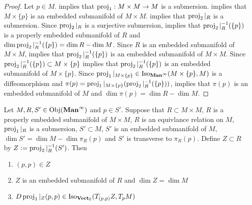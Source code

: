 \documentclass{book}
\begin{document}
	\begin{proof}
		Let $p \in M$.  implies that $\operatorname{\text{proj}}_1: M \times M \rightarrow M$ is a submersion. \rex{} implies that $M \times \{p\}$ is an embedded submanifold of $M \times M$.  implies that $\operatorname{\text{proj}}_2|_R$ is a submersion. Since $\operatorname{\text{proj}}_2|_R$ is a surjective submersion,  implies that $\operatorname{\text{proj}}_2|_R^{-1}(\{p\})$ is a properly embedded submanifold of $R$ and $\dim \operatorname{\text{proj}}_2|_R^{-1}(\{p\}) = \dim R - \dim M$. Since $R$ is an embedded submanifold of $M \times M$,   implies that $\operatorname{\text{proj}}_2|_R^{-1}(\{p\})$ is an embedded submanifold of $M \times M$. Since $\operatorname{\text{proj}}_2|_R^{-1}(\{p\}) \subset M \times \{p\}$  implies that $\operatorname{\text{proj}}_2|_R^{-1}(\{p\})$ is an embedded submanifold of $M \times \{p\}$. Since $\operatorname{\text{proj}}_1|_{M \times \{p\}} \in \operatorname{Iso}_{\operatorname*{\text{\textbf{Man}}^{\infty}}}(M \times \{p\}, M)$ is a diffeomorphism and $\pi(p) = \operatorname{\text{proj}}_1|_{M \times \{p\}}(\operatorname{\text{proj}}_2|_R^{-1}(\{p\}))$,   implies that $\pi(p)$ is an embedded submanifold of $M$ and $\dim \pi(p) = \dim R - \dim M$.
	\end{proof}

	\begin{ex}
		Let $M, R, S' \in \operatorname{Obj}(\operatorname*{\text{\textbf{Man}}^{\infty}})$ and $p \in S'$. Suppose that $R \subset M \times M$, $R$ is a properly embedded submanifold of $M \times M$, $R$ is an equivlance relation on $M$, $\operatorname{\text{proj}}_1|_R$ is a submersion, $S' \subset M$, $S'$ is an embedded submanifold of $M$, $\dim S' = \dim M - \dim \pi_R(p)$ and $S'$ is transverse to $\pi_R(p)$. Define $Z \subset R$ by $Z \vcentcolon= \operatorname{\text{proj}}_2|_R^{-1}(S')$. Then 
		\begin{enumerate}
			\item $(p,p) \in Z$
			\item $Z$ is an embedded submanifold of $R$ and $\dim Z = \dim M$
			\item $D\operatorname{\text{proj}}_1|_Z(p,p) \in \operatorname{Iso}_{\operatorname*{\text{\textbf{Vect}}_{\mathbb{R}}}}(T_{(p,p)}Z, T_pM)$
		\end{enumerate}
	\end{ex}
\end{document}
